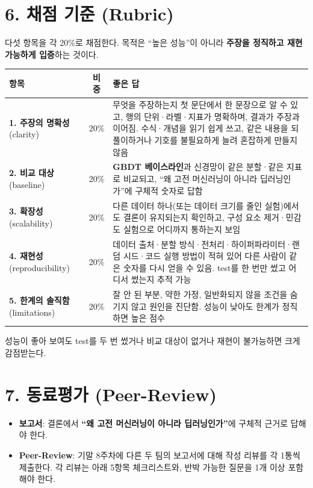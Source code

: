 \documentclass[12pt]{article}
\begin{document}
\section*{6. 채점 기준 (Rubric)}
다섯 항목을 각 20\%로 채점한다. 목적은 ``높은 성능''이 아니라 \textbf{주장을 정직하고 재현 가능하게 입증}하는 것이다.
\begin{center}
\small
\begin{tabular}{@{}p{3.3cm}cp{7.4cm}@{}}
\toprule
항목 & 비중 & 좋은 답 \\
\midrule
\textbf{1. 주장의 명확성} (clarity) & 20\% & 무엇을 주장하는지 첫 문단에서 한 문장으로 알 수 있고, 행의 단위·라벨·지표가 명확하며, 결과가 주장과 이어짐. 수식·개념을 읽기 쉽게 쓰고, 같은 내용을 되풀이하거나 기호를 불필요하게 늘려 혼잡하게 만들지 않음 \\
\textbf{2. 비교 대상} (baseline) & 20\% & \textbf{GBDT 베이스라인}과 신경망이 같은 분할·같은 지표로 비교되고, ``왜 고전 머신러닝이 아니라 딥러닝인가''에 구체적 숫자로 답함 \\
\textbf{3. 확장성} (scalability) & 20\% & 다른 데이터 하나(또는 데이터 크기를 줄인 실험)에서도 결론이 유지되는지 확인하고, 구성 요소 제거·민감도 실험으로 어디까지 통하는지 보임 \\
\textbf{4. 재현성} (reproducibility) & 20\% & 데이터 출처·분할 방식·전처리·하이퍼파라미터·랜덤 시드·코드 실행 방법이 적혀 있어 다른 사람이 같은 숫자를 다시 얻을 수 있음. test를 한 번만 썼고 어디서 썼는지 추적 가능 \\
\textbf{5. 한계의 솔직함} (limitations) & 20\% & 잘 안 된 부분, 약한 가정, 일반화되지 않을 조건을 숨기지 않고 원인을 진단함. 성능이 낮아도 한계가 정직하면 높은 점수 \\
\bottomrule
\end{tabular}
\end{center}
\vspace{4pt}
성능이 좋아 보여도 test를 두 번 썼거나 비교 대상이 없거나 재현이 불가능하면 크게 감점받는다.

\section*{7. 동료평가 (Peer-Review)}
\begin{itemize}
\item \textbf{보고서}: 결론에서 \textbf{``왜 고전
  머신러닝이 아니라 딥러닝인가''}에 구체적 근거로 답해야 한다.
\item \textbf{Peer-Review}: 기말 8주차에 다른 두 팀의 보고서에 대해
  작성 리뷰를 각 1통씩 제출한다. 각 리뷰는 아래 5항목
  체크리스트와, 반박 가능한 질문을 1개 이상 포함해야 한다.
\end{itemize}
\end{document}
